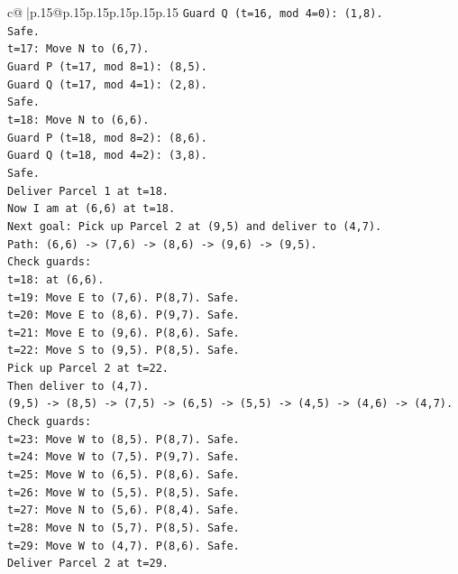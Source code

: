 \documentclass{article}
\begin{document}
{\begin{supertabular}{c@{$\;$}|p{.15\linewidth}@{}p{.15\linewidth}p{.15\linewidth}p{.15\linewidth}p{.15\linewidth}p{.15\linewidth}}
{{{\texttt{Guard Q (t=16, mod 4=0): (1,8).} \\
\texttt{Safe.} \\
\texttt{t=17: Move N to (6,7).} \\
\texttt{Guard P (t=17, mod 8=1): (8,5).} \\
\texttt{Guard Q (t=17, mod 4=1): (2,8).} \\
\texttt{Safe.} \\
\texttt{t=18: Move N to (6,6).} \\
\texttt{Guard P (t=18, mod 8=2): (8,6).} \\
\texttt{Guard Q (t=18, mod 4=2): (3,8).} \\
\texttt{Safe.} \\
\texttt{Deliver Parcel 1 at t=18.} \\
\texttt{Now I am at (6,6) at t=18.} \\
\texttt{Next goal: Pick up Parcel 2 at (9,5) and deliver to (4,7).} \\
\texttt{Path: (6,6) {-}> (7,6) {-}> (8,6) {-}> (9,6) {-}> (9,5).} \\
\texttt{Check guards:} \\
\texttt{t=18: at (6,6).} \\
\texttt{t=19: Move E to (7,6). P(8,7). Safe.} \\
\texttt{t=20: Move E to (8,6). P(9,7). Safe.} \\
\texttt{t=21: Move E to (9,6). P(8,6). Safe.} \\
\texttt{t=22: Move S to (9,5). P(8,5). Safe.} \\
\texttt{Pick up Parcel 2 at t=22.} \\
\texttt{Then deliver to (4,7).} \\
\texttt{(9,5) {-}> (8,5) {-}> (7,5) {-}> (6,5) {-}> (5,5) {-}> (4,5) {-}> (4,6) {-}> (4,7).} \\
\texttt{Check guards:} \\
\texttt{t=23: Move W to (8,5). P(8,7). Safe.} \\
\texttt{t=24: Move W to (7,5). P(9,7). Safe.} \\
\texttt{t=25: Move W to (6,5). P(8,6). Safe.} \\
\texttt{t=26: Move W to (5,5). P(8,5). Safe.} \\
\texttt{t=27: Move N to (5,6). P(8,4). Safe.} \\
\texttt{t=28: Move N to (5,7). P(8,5). Safe.} \\
\texttt{t=29: Move W to (4,7). P(8,6). Safe.} \\
\texttt{Deliver Parcel 2 at t=29.} \\
}}}
\end{supertabular}}
\end{document}
